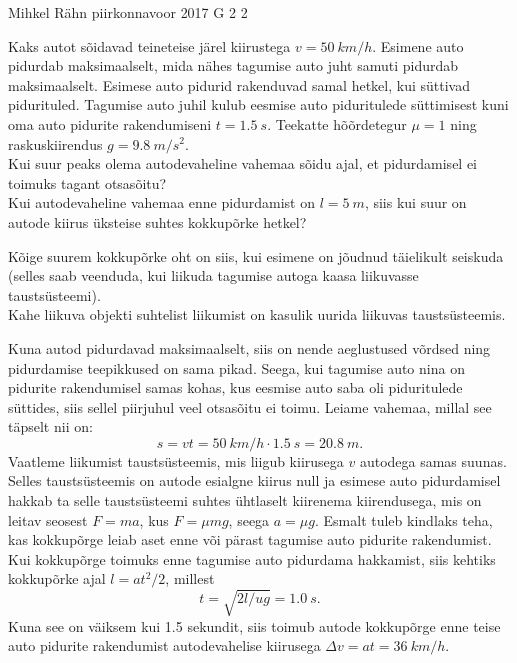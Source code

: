 {Mihkel Rähn} %
{piirkonnavoor} %
{2017} %
{G 2} %
{2} %
{
\ifStatement
Kaks autot sõidavad teineteise järel kiirustega $v=\SI{50}{km/h}$. Esimene auto pidurdab maksimaalselt, mida nähes tagumise auto juht samuti pidurdab maksimaalselt. Esimese auto pidurid rakenduvad samal hetkel, kui süttivad pidurituled. Tagumise auto juhil kulub eesmise auto piduritulede süttimisest kuni oma auto pidurite rakendumiseni $t=\SI{1,5}{s}$. Teekatte hõõrdetegur $\mu=1$ ning raskuskiirendus $g=\SI{9,8}{m/s^2}$.\\
\osa Kui suur peaks olema autodevaheline vahemaa sõidu ajal, et pidurdamisel ei toimuks tagant otsasõitu?\\
\osa Kui autodevaheline vahemaa enne pidurdamist on $l=\SI{5}{m}$, siis kui suur on autode kiirus üksteise suhtes kokkupõrke hetkel?
\fi


\ifHint
\osa Kõige suurem kokkupõrke oht on siis, kui esimene on jõudnud täielikult seiskuda (selles saab veenduda, kui liikuda tagumise autoga kaasa liikuvasse taustsüsteemi).\\
\osa Kahe liikuva objekti suhtelist liikumist on kasulik uurida liikuvas taustsüsteemis.
\fi


\ifSolution
\osa Kuna autod pidurdavad maksimaalselt, siis on nende aeglustused võrdsed ning pidurdamise teepikkused on sama pikad. Seega, kui tagumise auto nina on pidurite rakendumisel samas kohas, kus eesmise auto saba oli piduritulede süttides, siis sellel piirjuhul veel otsasõitu ei toimu. Leiame vahemaa, millal see täpselt nii on:
\[
s=vt=\SI{50}{km/h}\cdot\SI{1,5}{s}=\SI{20,8}{m}.
\]
\osa Vaatleme liikumist taustsüsteemis, mis liigub kiirusega $v$ autodega samas suunas. Selles taustsüsteemis on autode esialgne kiirus null ja esimese auto pidurdamisel hakkab ta selle taustsüsteemi suhtes ühtlaselt kiirenema kiirendusega, mis on leitav seosest $F=ma$, kus $F=\mu mg$, seega $a=\mu g$. Esmalt tuleb kindlaks teha, kas kokkupõrge leiab aset enne või pärast tagumise auto pidurite rakendumist. Kui kokkupõrge toimuks enne tagumise auto pidurdama hakkamist, siis kehtiks kokkupõrke ajal $l=at^2/2$, millest
\[
t=\sqrt{2l/ug}=\SI{1.0}{s}.
\]
Kuna see on väiksem kui \num{1,5} sekundit, siis toimub autode kokkupõrge enne teise auto pidurite rakendumist autodevahelise kiirusega $\Delta v=at=\SI{36}{km/h}$.
\fi


}
